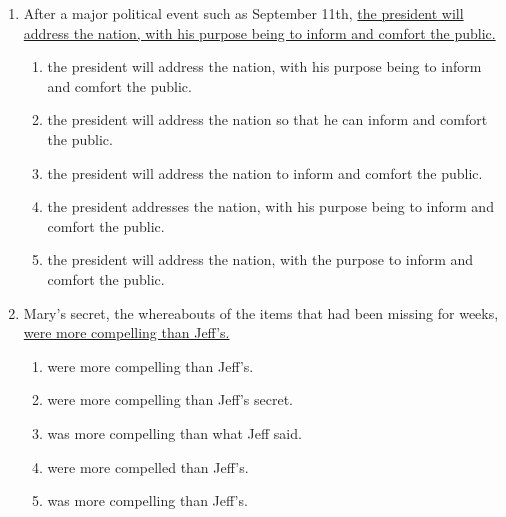 \begin{enumerate}
\begin{spacing}{1.5}
\begin{enumerate}[label=(\Alph*)]
\hrulefill
\end{enumerate}
\end{spacing}

\bigskip
\item After a major political event such as September 11th, \ul{the president will address the nation, with his purpose being to inform and comfort the public.}

\begin{spacing}{1.5}
\begin{enumerate}[label=(\Alph*)]
\item the president will address the nation, with his purpose being to inform and comfort the public.

\hrulefill

\item the president will address the nation so that he can inform and comfort the public.

\hrulefill

\item the president will address the nation to inform and comfort the public.

\hrulefill

\item the president addresses the nation, with his purpose being to inform and comfort the public.

\hrulefill

\item the president will address the nation, with the purpose to inform and comfort the public.

\hrulefill
\end{enumerate}
\end{spacing}

\bigskip
\item Mary's secret, the whereabouts of the items that had been missing for weeks, \ul{were more compelling than Jeff's.}

\begin{spacing}{1.5}
\begin{enumerate}[label=(\Alph*)]
\item were more compelling than Jeff's.

\hrulefill

\item were more compelling than Jeff's secret.

\hrulefill

\item was more compelling than what Jeff said.

\hrulefill

\item were more compelled than Jeff's.

\hrulefill

\item was more compelling than Jeff's.

\hrulefill
\end{enumerate}
\end{spacing}
\end{enumerate}